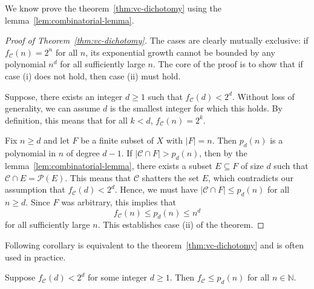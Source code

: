 We know prove the theorem~\ref{thm:vc-dichotomy} using the lemma~\ref{lem:combinatorial-lemma}.

\begin{proof}[Proof of Theorem~\ref{thm:vc-dichotomy}]

    The cases are clearly mutually exclusive: if $f_{\mathcal{C}}(n) = 2^n$ for all $n$, its exponential growth cannot be bounded by any polynomial $n^d$ for all sufficiently large $n$. The core of the proof is to show that if case (i) does not hold, then case (ii) must hold.

    Suppose, there exists an integer $d \ge 1$ such that $f_{\mathcal{C}}(d) < 2^d$. Without loss of generality, we can assume $d$ is the smallest integer for which this holds. By definition, this means that for all $k < d$, $f_{\mathcal{C}}(n) = 2^k$.

    Fix $n \geq d$ and let $F$ be a finite subset of $X$ with $|F| = n$. Then $p_d(n)$ is a polynomial in $n$ of degree $d-1$. If $|\mathcal{C} \cap F| > p_d(n)$, then by the lemma~\ref{lem:combinatorial-lemma}, there exists a subset $E \subseteq F$ of size $d$ such that $\mathcal{C} \cap E = \mathcal{P}(E)$. This means that $\mathcal{C}$ shatters the set $E$, which contradicts our assumption that $f_{\mathcal{C}}(d) < 2^d$. Hence, we must have $|\mathcal{C} \cap F| \leq p_d(n)$ for all $n \geq d$. Since $F$ was arbitrary, this implies that
    \[
        f_{\mathcal{C}}(n) \leq p_d(n) \leq n^d
    \]
    for all sufficiently large $n$. This establishes case (ii) of the theorem.


\end{proof}

Following corollary is equivalent to the theorem~\ref{thm:vc-dichotomy} and is often used in practice.

\begin{corollary}
    \label{cor:vc-dichotomy}
    Suppose $f_{\mathcal{C}}(d) < 2^d$ for some integer $d \ge 1$. Then $f_{\mathcal{C}} \leq p_d(n)$ for all $n \in \mathbb{N}$.
\end{corollary}